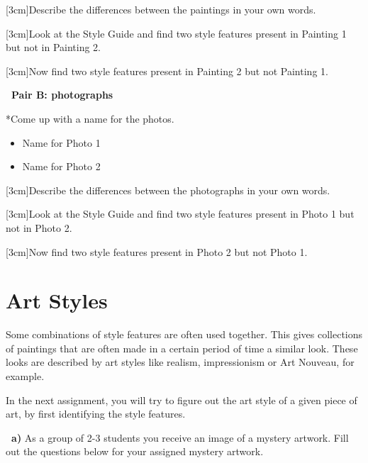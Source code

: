 \documentclass[12pt]{article}
\makeatletter
\newcounter{exercise}
\newcommand{\exercisetitle}[2][]{%
  \refstepcounter{exercise}%
  \vspace{0.5cm}%
  \colorbox{maincolor}{%
    \makebox[\dimexpr\linewidth-2\fboxsep][l]{%
      \textcolor{white}{\faPen\ Assignment \theexercise:~ #2}%
    }%
  }%
  \if\relax\detokenize{#1}\relax\else\label{#1}\fi
  \vspace{0.3cm}%
}
\newcounter{question}
\newlength\questionheight
\newcommand{\question}{\@ifstar{\question@text}{\question@field}}
\newcommand{\question@heading}[1]{%
  \refstepcounter{question}%
  \vspace{0.3cm}%
  \noindent\textbf{\faEdit\ Question \thequestion: #1}%
}
\newcommand{\question@text}[1]{%
  \question@heading{#1}%
}
\newcommand{\question@field}[2][\questionheight]{%
  \question@heading{#2}%
 \\[0.3em] \begin{Form}
    \TextField[
      name=Q\thequestion,
      multiline=true,
      width=\linewidth,
      height=#1,
      charsize=10pt,
      bordercolor={0 0 0},
      borderwidth=1.8,
      backgroundcolor={1 1 1}
    ]{}
  \end{Form}
  \vspace{0.3cm}%
}
\makeatother
\begin{document}
\question[3cm]{Describe the differences between the paintings in your own words.}

\question[3cm]{Look at the Style Guide and find two style features present in Painting 1 but not in Painting 2.}

\question[3cm]{Now find two style features present in Painting 2 but not Painting 1.}

\textcolor{maincolor}{\textbf{\faPen\ Pair B: photographs}}

\question*{Come up with a name for the photos.} 
\begin{Form}
\begin{itemize}
    \item Name for Photo 1 \\[0.2cm]
\TextField[name=photo1,width=\linewidth,height=0.4cm,multiline=true, bordercolor={0 0 0}]{}
    \item Name for Photo 2\\[0.2cm]
\TextField[name=photo2,width=\linewidth,height=0.4cm,multiline=true, bordercolor={0 0 0}]{}
\end{itemize}
\end{Form}

\question[3cm]{Describe the differences between the photographs in your own words.}

\question[3cm]{Look at the Style Guide and find two style features present in Photo 1 but not in Photo 2.}

\question[3cm]{Now find two style features present in Photo 2 but not Photo 1.}

\section{Art Styles}

Some combinations of style features are often used together. This gives collections of paintings that are often made in a certain period of time a similar look. These looks are described by art styles like realism, impressionism or Art Nouveau, for example.

In the next assignment, you will try to figure out the art style of a given piece of art, by first identifying the style features.

\exercisetitle[]{Mystery art work}

\textcolor{maincolor}{\textbf{\faPen\ a) }} As a group of 2-3 students you receive an image of a mystery artwork. Fill out the questions below for your assigned mystery artwork. 
\end{document}
